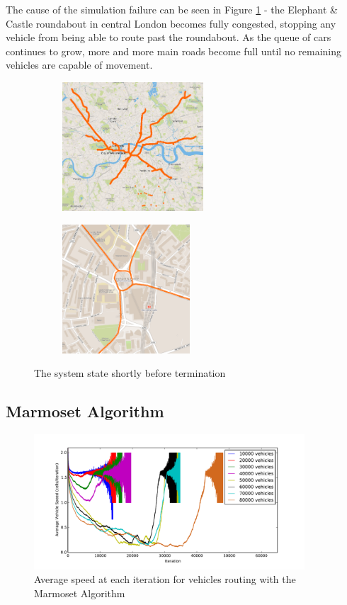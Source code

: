 \documentclass[ %
                    author={Alexander Hill},
                supervisor={Dr. Benjamin Sach},
                    degree={MEng},
                     title={MARMOSET},
                  subtitle={Multi-Agent Route Management using Online Simulation for Efficient Transportation},
                      type={research},
                      year={2016} ]{dissertation}
\begin{document}
The cause of the simulation failure can be seen in Figure \ref{fig:dijkstra-wtf}
- the Elephant \& Castle roundabout in central London becomes fully congested,
stopping any vehicle from being able to route past the roundabout. As the queue
of cars continues to grow, more and more main roads become full until no
remaining vehicles are capable of movement.

\begin{figure}[h]
\centering
\begin{subfigure}[b]{0.4\textwidth}
    \centering
    \includegraphics[height=13em]{dij-60k-blocked-wide}
\end{subfigure}
\hspace{1em}
\begin{subfigure}[b]{0.4\textwidth}
    \centering
    \includegraphics[height=13em]{dij-60k-blocked-close}
\end{subfigure}
\caption{The system state shortly before termination}\label{fig:dijkstra-wtf}
\end{figure}

\subsection{Marmoset Algorithm}\label{sec:marmoset-eval}

\begin{figure}[p]
    \centering
    \includegraphics[width=0.9\textwidth]{sdv-speed}
    \caption{Average speed at each iteration for vehicles routing with the Marmoset Algorithm}\label{fig:sdv-speed}
\end{figure}
\end{document}
